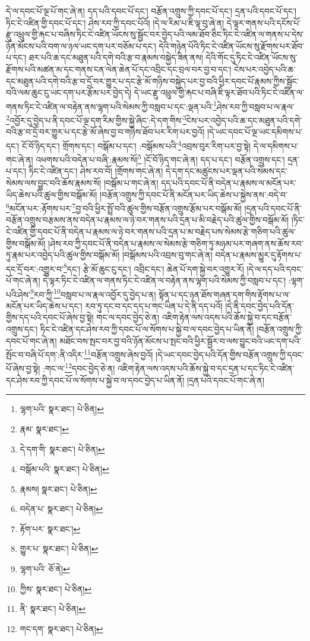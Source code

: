 དེ་ལ་དབང་པོ་ལྔ་པོ་གང་ཞེ་ན། དད་པའི་དབང་པོ་དང་། བརྩོན་འགྲུས་ཀྱི་དབང་པོ་དང་། དྲན་པའི་དབང་པོ་དང་། ཏིང་ངེ་འཛིན་གྱི་དབང་པོ་དང་། ཤེས་རབ་ཀྱི་དབང་པོའོ། །དེ་ལ་རིམ་པ་ཇི་ལྟ་བུ་ཞེ་ན། དེ་ལྟར་གནས་པའི་དངོས་པོ་རྫུ་འཕྲུལ་གྱི་རྐང་པ་བཞིས་ཏིང་ངེ་འཛིན་ཡོངས་སུ་སྦྱོང་བར་བྱེད་པའི་ལམ་ཐོབ་ཅིང་ཏིང་ངེ་འཛིན་ལ་གནས་པ་དེས་ཉོན་མོངས་པའི་བག་ལ་ཉལ་ཡང་དག་པར་བཅོམ་པ་དང་། དེའི་གཉེན་པོའི་ཏིང་ངེ་འཛིན་ཡོངས་སུ་རྫོགས་པར་ཐོབ་པ་དང་། ཐར་པའི་ཆ་དང་མཐུན་པའི་དགེ་བའི་རྩ་བ་རྣམས་བསྐྱེད་ཟིན་ནས། དེའི་གོང་དུ་ཏིང་ངེ་འཛིན་ཡོངས་སུ་རྫོགས་པའི་མཚན་མ་དང་གནས་ངན་ལེན་ཆེན་པོ་དང་འབྲིང་དང་བྲལ་བར་བྱ་བ་དང་། ངེས་པར་འབྱེད་པའི་ཆ་དང་མཐུན་པའི་དགེ་བའི་རྩ་བ་དྲོ་བར་གྱུར་པ་དང་རྩེ་མོ་གཉིས་བསྐྱེད་པར་བྱ་བའི་ཕྱིར་དབང་པོ་རྣམས་ཀྱིས་སྦྱོང་བའི་ལམ་ཆུང་ངུ་ཡང་དག་པར་རྩོམ་པར་བྱེད་དེ། དེ་ཡང་རྫུ་འཕྲུལ་གྱི་རྐང་པ་བཞི་ཇི་ལྟར་ཐོབ་པའི་ཏིང་ངེ་འཛིན་ལ་གནས་ཏིང་ངེ་འཛིན་ལ་བརྟེན་ནས་ལྷག་པའི་སེམས་ཀྱི་བསླབ་པ་དང་:ལྡན་པའི་\footnote{ལྷག་པའི་  སྣར་ཐང་།  པེ་ཅིན། }ཤེས་རབ་ཀྱི་བསླབ་པ་ལ་རྣལ་\footnote{རྣམ་  སྣར་ཐང་། }འབྱོར་དུ་བྱེད་པ་ནི་དབང་པོ་ལྔ་དག་རིམ་གྱིས་སྐྱེ་ཞིང་:དེ་དག་གིས་\footnote{དེ་དག་གི་  སྣར་ཐང་།  པེ་ཅིན། }ངེས་པར་འབྱེད་པའི་ཆ་དང་མཐུན་པའི་དགེ་བའི་རྩ་བ་དྲོ་བར་གྱུར་པ་དང་རྩེ་མོ་ཞེས་བྱ་བ་གཉིས་ཐོབ་པར་རིག་པར་བྱའོ། །དེ་ཡང་དབང་པོ་ལྔ་ཡང་དམིགས་པ་དང་། ངོ་བོ་ཉིད་དང་། གྲོགས་དང་། བསྒོམ་པ་དང་། :བསྒོམས་པའི་\footnote{བསྒོམ་པའི་  སྣར་ཐང་།  པེ་ཅིན། }འབྲས་བུར་རིག་པར་བྱ་སྟེ། དེ་ལ་དམིགས་པ་གང་ཞེ་ན། འཕགས་པའི་བདེན་པ་བཞི་:རྣམས་སོ།\footnote{རྣམས།  སྣར་ཐང་།  པེ་ཅིན། } །ངོ་བོ་ཉིད་གང་ཞེ་ན། དད་པ་དང་། བརྩོན་འགྲུས་དང་། དྲན་པ་དང་། ཏིང་ངེ་འཛིན་དང་། ཤེས་རབ་བོ། །གྲོགས་གང་ཞེ་ན། དེ་དག་དང་མཚུངས་པར་ལྡན་པའི་སེམས་དང་སེམས་ལས་བྱུང་བའི་ཆོས་རྣམས་སོ། །བསྒོམ་པ་གང་ཞེ་ན། དད་པའི་དབང་པོ་ནི་བདེན་པ་རྣམས་ལ་མངོན་པར་ཡིད་ཆེས་པའི་ཚུལ་གྱིས་བསྒོམ་མོ། །བརྩོན་འགྲུས་ཀྱི་དབང་པོ་ནི་མངོན་པར་ཡིད་ཆེས་པ་སྐྱེས་ནས་:བདེ་བ་\footnote{བདེན་པ་  སྣར་ཐང་།  པེ་ཅིན། }མངོན་པར་:རྟོགས་པར་\footnote{རྟོག་པར་  སྣར་ཐང་། }བྱ་བའི་ཕྱིར་སྤྲོ་བའི་ཚུལ་གྱིས་བརྩོན་འགྲུས་རྩོམ་པར་བསྒོམ་མོ། །དྲན་པའི་དབང་པོ་ནི་བརྩོན་འགྲུས་བརྩམས་ནས་བདེན་པ་རྣམས་ལ་ཉེ་བར་གནས་པའི་དྲན་པ་མི་བརྗེད་པའི་ཚུལ་གྱིས་བསྒོམ་མོ། །ཏིང་ངེ་འཛིན་གྱི་དབང་པོ་ནི་བདེན་པ་རྣམས་ལ་ཉེ་བར་གནས་པའི་དྲན་པ་མ་བརྗེད་པས་སེམས་རྩེ་གཅིག་པའི་ཚུལ་གྱིས་བསྒོམ་མོ། །ཤེས་རབ་ཀྱི་དབང་པོ་ནི་བདེན་པ་རྣམས་ལ་སེམས་རྩེ་གཅིག་ཏུ་མཉམ་པར་གཞག་ནས་ཆོས་རབ་ཏུ་རྣམ་པར་འབྱེད་པའི་ཚུལ་གྱིས་བསྒོམ་མོ། །བསྒོམས་པའི་འབྲས་བུ་གང་ཞེ་ན། བདེན་པ་རྣམས་མྱུར་དུ་རྟོགས་པ་དང་དྲོ་བར་:འགྱུར་བ་\footnote{གྱུར་པ་  སྣར་ཐང་།  པེ་ཅིན། }དང་། རྩེ་མོ་ཆུང་ངུ་དང་། འབྲིང་དང་། ཆེན་པོ་དག་སྐྱེ་བར་འགྱུར་རོ། །དེ་ལ་དད་པའི་དབང་པོ་གང་ཞེ་ན། དེ་ལྟར་ཏིང་ངེ་འཛིན་ལ་གནས་ཏིང་ངེ་འཛིན་ལ་བརྟེན་ནས་ལྷག་པའི་སེམས་ཀྱི་བསླབ་པ་དང་། :ལྷག་པའི་ཤེས་\footnote{ལྷག་པའི་  ཅོ་ནེ། }རབ་ཀྱི་\footnote{ཀྱིས་  སྣར་ཐང་།  པེ་ཅིན། }བསླབ་པ་ལ་རྣལ་འབྱོར་དུ་བྱེད་པ་ན། སྟོན་པ་དང་ཉན་ཐོས་གཞན་དག་གིས་རྟོགས་པ་ལ་མངོན་པར་ཡིད་ཆེས་པ་དང་། རབ་ཏུ་དང་བ་དང་དད་པ་གང་ཡིན་པ་དེ་ནི་དད་པའོ། །དེ་ནི་དབང་བྱེད་པའི་དོན་གྱིས་དད་པའི་དབང་པོ་ཞེས་བྱ་སྟེ། གང་ལ་དབང་བྱེད་ཅེ་ན། འཇིག་རྟེན་ལས་འདས་པའི་ཆོས་སྐྱེ་བ་དང་བརྩོན་འགྲུས་དང་། ཏིང་ངེ་འཛིན་དང་ཤེས་རབ་ཀྱི་དབང་པོ་ལ་སོགས་པ་སྐྱེ་བ་ལ་དབང་བྱེད་པ་ཡིན་ནོ། །བརྩོན་འགྲུས་ཀྱི་དབང་པོ་གང་ཞེ་ན། མཐོང་བས་སྤང་བར་བྱ་བའི་ཉོན་མོངས་པ་སྤང་བའི་ཕྱིར་སྦྱོར་བ་ལས་བྱུང་བའི་ཡང་དག་པའི་སྤོང་བ་བཞི་པོ་དག་:ནི་འདིར་\footnote{ནི་  སྣར་ཐང་།  པེ་ཅིན། }བརྩོན་འགྲུས་ཞེས་བྱའོ། །དེ་ཡང་དབང་བྱེད་པའི་དོན་གྱིས་བརྩོན་འགྲུས་ཀྱི་དབང་པོ་ཞེས་བྱ་སྟེ། :གང་ལ་\footnote{གང་དག་  སྣར་ཐང་།  པེ་ཅིན། }དབང་བྱེད་ཅེ་ན། འཇིག་རྟེན་ལས་འདས་པའི་ཆོས་སྐྱེ་བ་དང་དྲན་པ་དང་ཏིང་ངེ་འཛིན་དང་ཤེས་རབ་ཀྱི་དབང་པོ་ལ་སོགས་པ་སྐྱེ་བ་ལ་དབང་བྱེད་པ་ཡིན་ནོ། །དྲན་པའི་དབང་པོ་གང་ཞེ་ན། 